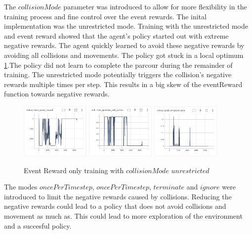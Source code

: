 The $collisionMode$ parameter was introduced to allow for more flexibility in the training process and fine control over the event rewards. The inital implementation was the unrestricted mode. Training with the unrestricted mode and event reward showed that the agent's policy started out with extreme negative rewards. The agent quickly learned to avoid these negative rewards by avoiding all collisions and movements. The policy got stuck in a local optimum \ref{fig:event_reward_only_collisionModeUnrestricted_event_reward}.The policy did not learn to complete the parcour during the remainder of training. The unrestricted mode potentially triggers the collision's negative rewards multiple times per step. This results in a big skew of the eventReward function towards negative rewards.

\begin{figure}
    \centering
    \includegraphics[width=0.3\textwidth]{Bilder/tensorboard_images/eventRewardOnly_collisionModeUnrestricted_eventReward.png}
    \includegraphics[width=0.3\textwidth]{Bilder/tensorboard_images/eventRewardOnly_collisionModeUnrestricted_collisionRate.png}
    \includegraphics[width=0.3\textwidth]{Bilder/tensorboard_images/eventRewardOnly_collisionModeUnrestricted_goalCompletionRate.png}
    \caption{Event Reward only training with $collisionMode$ $unrestricted$}
    \label{fig:event_reward_only_collisionModeUnrestricted_event_reward}
\end{figure}

The modes $oncePerTimestep$, $oncePerTimestep$, $terminate$ and $ignore$ were introduced to limit the negative rewards caused by collisions. Reducing the negative rewards could lead to a policy that does not avoid collisions and movement as much as. This could lead to more exploration of the environment and a succesful policy.


